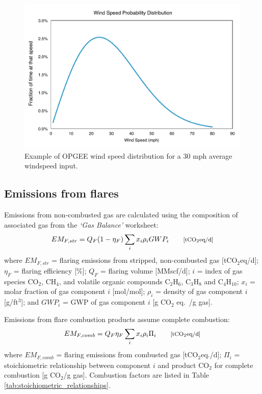 \documentclass[11pt]{report}
\newcommand{\marg}[1]{{\footnotesize\textit{\textcolor{stanford}{'#1'}}}}
\newcommand{\marginnote}[1]{\marginpar{\marg{#1}}}
\newcommand{\sheet}[1]{\textit{`{#1}'}}
\begin{document}
\begin{figure}[t]
\includegraphics[width=1\columnwidth]{images/wind30mph.pdf}
\caption{Example of OPGEE wind speed distribution for a 30 mph average windspeed input.}
\label{fig:wind_example}
\end{figure}


\subsection{Emissions from flares}

Emissions from non-combusted gas are calculated using the composition of associated gas from the \sheet{Gas Balance} worksheet: \marginnote{Flaring \\ 3.2.2.1}
\begin{equation} \label{eq:flare_emissions_stripping}
EM_{F,str} = Q_{F}(1-\eta_{F}) \sum_i x_i \rho _{i} GWP_{i} \quad \quad \footnotesize{\text{[tCO$_{2}$eq/d]}}
\end{equation}
where $EM_{F,str}$ = flaring emissions from stripped, non-combusted gas [tCO$_{2}$eq/d]; $\eta_{F}$ = flaring efficiency [\%]; $Q_{F}$ = flaring volume [MMscf/d]; $i$ = index of gas species CO$_{2}$, CH$_{4}$, and volatile organic compounds C$_{2}$H$_{6}$, C$_{3}$H$_{8}$ and C$_{4}$H$_{10}$; $x_i$ = molar fraction of gas component $i$ [mol/mol]; $\rho _{i}$ = density of gas component $i$ [g/ft$^{3}$]; and $GWP_{i}$ = GWP of gas component $i$ [g CO$_2$ eq.\ /g gas]. 

Emissions from flare combustion products assume complete combustion: \marginnote{Flaring \\ 3.2.1.1}
\begin{equation} \label{eq:flare_emissions_combustion}
EM_{F,comb} = Q_{F} \eta_{F} \sum_i x_i \rho _{i} \Pi_{i} \quad \quad \footnotesize{\text{[tCO$_{2}$eq/d]}}
\end{equation}
where $EM_{F,comb}$ = flaring emissions from combusted gas [tCO$_{2}$eq./d]; $\Pi_{i}$ = stoichiometric relationship between component $i$ and product CO$_{2}$ for complete combustion [g CO$_2$/g gas]. Combustion factors are listed in Table\,\ref{tab:stoichiometric_relationships}. 
\end{document}
